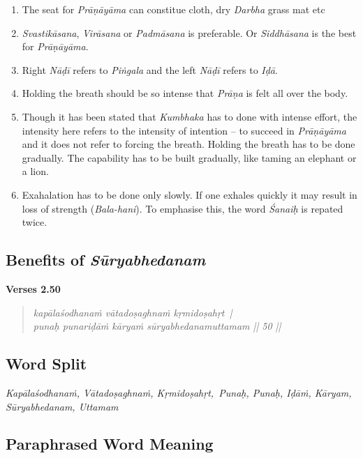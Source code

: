 \begin{enumerate}
\itemsep=0pt
\item The seat for \textit{Prāṇāyāma} can constitue cloth, dry \textit{Darbha} grass mat etc
\item \textit{Svastikāsana}, \textit{Virāsana} or \textit{Padmāsana} is preferable. Or \textit{Siddhāsana} is the best for \textit{Prāṇāyāma}. 
\item Right \textit{Nāḍī} refers to \textit{Piṅgala} and the left \textit{Nāḍī} refers to \textit{Iḍā}. 
\item Holding the breath should be so intense that \textit{Prāṇa} is felt all over the body. 
\item Though it has been stated that \textit{Kumbhaka} has to done with intense effort, the intensity here refers to the intensity of intention – to succeed in \textit{Prāṇāyāma} and it does not refer to forcing the breath. Holding the breath has to be done gradually. The capability has to be built gradually, like taming an elephant or a lion. 
\item Exahalation has to be done only slowly. If one exhales quickly it may result in loss of strength (\textit{Bala-hani}). To emphasise this, the word \textit{Śanaiḥ} is repated twice.       
\end{enumerate}
\newpage
	
\subsection*{Benefits of \textit{Sūryabhedanam}}


\noindent \textbf{Verses 2.50}

\begin{verse}
\textit{kapālaśodhanaṁ vātadoṣaghnaṁ kṛmidoṣahṛt |\\
punaḥ punariḍāṁ kāryaṁ sūryabhedanamuttamam || 50 ||}
\end{verse}

\subsection*{Word Split}


\textit{Kapālaśodhanaṁ, Vātadoṣaghnaṁ, Kṛmidoṣahṛt, Punaḥ, Punaḥ, Iḍāṁ, Kāryam, Sūryabhedanam, Uttamam}

\subsection*{Paraphrased Word Meaning}


